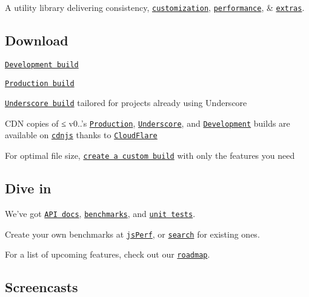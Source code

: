A utility library delivering consistency, \href{http://lodash.com/custom-builds}{\tt customization}, \href{http://lodash.com/benchmarks}{\tt performance}, \& \href{http://lodash.com/#features}{\tt extras}.

\subsection*{Download}


\begin{DoxyItemize}
\item \href{https://raw.github.com/lodash/lodash/0.9.2/lodash.js}{\tt Development build}
\item \href{https://raw.github.com/lodash/lodash/0.9.2/lodash.min.js}{\tt Production build}
\item \href{https://raw.github.com/lodash/lodash/0.9.2/lodash.underscore.min.js}{\tt Underscore build} tailored for projects already using Underscore
\item C\+D\+N copies of ≤ v0..’s \href{http://cdnjs.cloudflare.com/ajax/libs/lodash.js/0.9.2/lodash.min.js}{\tt Production}, \href{http://cdnjs.cloudflare.com/ajax/libs/lodash.js/0.9.2/lodash.underscore.min.js}{\tt Underscore}, and \href{http://cdnjs.cloudflare.com/ajax/libs/lodash.js/0.9.2/lodash.js}{\tt Development} builds are available on \href{http://cdnjs.com/}{\tt cdnjs} thanks to \href{http://www.cloudflare.com/}{\tt Cloud\+Flare}
\item For optimal file size, \href{http://lodash.com/custom-builds}{\tt create a custom build} with only the features you need
\end{DoxyItemize}

\subsection*{Dive in}

We’ve got \href{http://lodash.com/docs}{\tt A\+P\+I docs}, \href{http://lodash.com/benchmarks}{\tt benchmarks}, and \href{http://lodash.com/tests}{\tt unit tests}.

Create your own benchmarks at \href{http://jsperf.com}{\tt js\+Perf}, or \href{http://jsperf.com/search?q=lodash}{\tt search} for existing ones.

For a list of upcoming features, check out our \href{https://github.com/lodash/lodash/wiki/Roadmap}{\tt roadmap}.

\subsection*{Screencasts}

